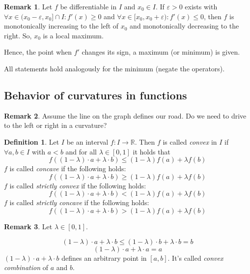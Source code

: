 \documentclass[a4paper,landscape,twocolumn]{article}
\theoremstyle{definition}
\newtheorem{defi}{Definition}
\newtheorem{rem}{Remark}
\begin{document}
\begin{rem}
  Let $f$ be differentiable in $I$ and $x_0 \in I$.
  If $\varepsilon > 0$ exists with
  $\forall x \in (x_0 - \varepsilon, x_0] \cap I: f'(x) \geq 0$
  and $\forall x \in [x_0, x_0 + \varepsilon): f'(x) \leq 0$,
  then $f$ is monotonically increasing to the left of $x_0$
  and monotonically decreasing to the right.
  So, $x_0$ is a local maximum.

  Hence, the point when $f'$ changes its sign, a maximum (or minimum) is given.

  All statements hold analogously for the minimum (negate the operators).
\end{rem}

\subsection{Behavior of curvatures in functions}
%
\begin{rem}
  Assume the line on the graph defines our road.
  Do we need to drive to the left or right in a curvature?
\end{rem}
%
\begin{defi}
  Let $I$ be an interval $f: I \to \mathbb R$. Then $f$ is called \emph{convex}
  in $I$ if $\forall a,b \in I$ with $a < b$ and for all $\lambda \in [0,1]$
  it holds that
  \[ f((1 - \lambda) \cdot a + \lambda \cdot b) \leq (1 - \lambda) f(a) + \lambda f(b) \]
  $f$ is called \emph{concave} if the following holds:
  \[ f((1 - \lambda) \cdot a + \lambda \cdot b) \geq (1 - \lambda) f(a) + \lambda f(b) \]
  $f$ is called \emph{strictly convex} if the following holds:
  \[ f((1 - \lambda) \cdot a + \lambda \cdot b) < (1 - \lambda) f(a) + \lambda f(b) \]
  $f$ is called \emph{strictly concave} if the following holds:
  \[ f((1 - \lambda) \cdot a + \lambda \cdot b) > (1 - \lambda) f(a) + \lambda f(b) \]
\end{defi}
%
\begin{rem}
  Let $\lambda \in [0,1]$.

  \[ (1 - \lambda) \cdot a + \lambda \cdot b \leq (1 - \lambda) \cdot b + \lambda \cdot b = b \]
  \[ (1 - \lambda) \cdot a + \lambda \cdot a = a \]
  $(1 - \lambda) \cdot a + \lambda \cdot b$ defines an arbitrary point in $[a,b]$.
  It's called \emph{convex combination} of $a$ and $b$.
\end{rem}
\end{document}

